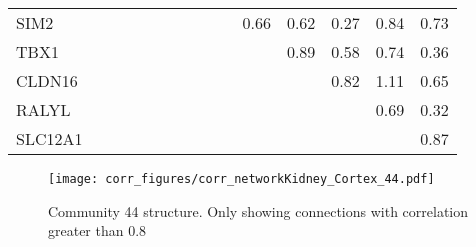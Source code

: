 \begin{longtable}{lrrrrrrrrrrrrrr}
SIM2    &             &            &            &               &            &              &              &            &            &       0.66 &         0.62 &        0.27 &          0.84 &       0.73 \\
TBX1    &             &            &            &               &            &              &              &            &            &            &         0.89 &        0.58 &          0.74 &       0.36 \\
CLDN16  &             &            &            &               &            &              &              &            &            &            &              &        0.82 &          1.11 &       0.65 \\
RALYL   &             &            &            &               &            &              &              &            &            &            &              &             &          0.69 &       0.32 \\
SLC12A1 &             &            &            &               &            &              &              &            &            &            &              &             &               &       0.87 \\
\end{longtable}


\begin{figure}[h!]
\centering
\texttt{[image: corr\_figures/corr\_networkKidney\_Cortex\_44.pdf]}
\caption{Community 44 structure. Only showing connections with correlation greater than 0.8}
\end{figure}




